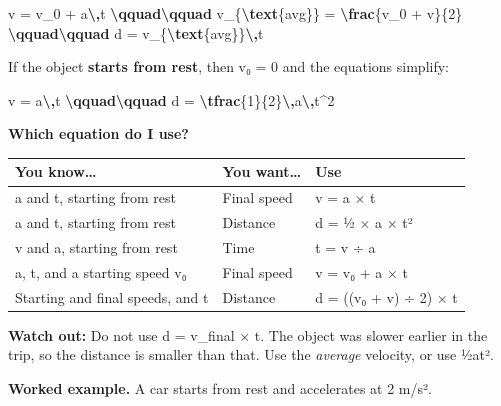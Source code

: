 \documentclass[
]{article}
\newenvironment{Shaded}{\begin{snugshade}}{\end{snugshade}}
\newcommand{\FunctionTok}[1]{\textcolor[rgb]{0.13,0.29,0.53}{\textbf{#1}}}
\newcommand{\NormalTok}[1]{#1}
\newcounter{none} %
\begin{document}
\begin{Shaded}
\begin{Highlighting}[]
\NormalTok{v = v\_0 + a}\FunctionTok{\textbackslash{},}\NormalTok{t }\FunctionTok{\textbackslash{}qquad\textbackslash{}qquad}\NormalTok{ v\_\{}\FunctionTok{\textbackslash{}text}\NormalTok{\{avg\}\} = }\FunctionTok{\textbackslash{}frac}\NormalTok{\{v\_0 + v\}\{2\} }\FunctionTok{\textbackslash{}qquad\textbackslash{}qquad}\NormalTok{ d = v\_\{}\FunctionTok{\textbackslash{}text}\NormalTok{\{avg\}\}}\FunctionTok{\textbackslash{},}\NormalTok{t}
\end{Highlighting}
\end{Shaded}

If the object \textbf{starts from rest}, then v₀ = 0 and the equations
simplify:

\begin{Shaded}
\begin{Highlighting}[]
\NormalTok{v = a}\FunctionTok{\textbackslash{},}\NormalTok{t }\FunctionTok{\textbackslash{}qquad\textbackslash{}qquad}\NormalTok{ d = }\FunctionTok{\textbackslash{}tfrac}\NormalTok{\{1\}\{2\}}\FunctionTok{\textbackslash{},}\NormalTok{a}\FunctionTok{\textbackslash{},}\NormalTok{t\^{}2}
\end{Highlighting}
\end{Shaded}

\textbf{Which equation do I use?}

{\def\LTcaptype{none} %
\begin{longtable}[]{@{}lll@{}}
\toprule\noalign{}
You know\ldots{} & You want\ldots{} & Use \\
\midrule\noalign{}
\endhead
\bottomrule\noalign{}
\endlastfoot
a and t, starting from rest & Final speed & v = a × t \\
a and t, starting from rest & Distance & d = ½ × a × t² \\
v and a, starting from rest & Time & t = v ÷ a \\
a, t, and a starting speed v₀ & Final speed & v = v₀ + a × t \\
Starting and final speeds, and t & Distance & d = ((v₀ + v) ÷ 2) × t \\
\end{longtable}
}

\textbf{Watch out:} Do not use d = v\_final × t. The object was slower
earlier in the trip, so the distance is smaller than that. Use the
\emph{average} velocity, or use ½at².

\textbf{Worked example.} A car starts from rest and accelerates at 2
m/s².
\end{document}

